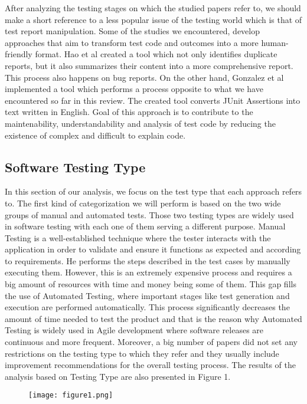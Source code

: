 After analyzing the testing stages on which the studied papers refer to, we should make a short reference to a less popular issue of the testing world which is that of test report manipulation. Some of the studies 
we encountered, develop approaches that aim to transform test code and outcomes into a more human-friendly format. Hao et al \cite{8811987} created a tool which not only identifies duplicate reports, but it also 
summarizes their content into a more comprehensive report. This process also happens on bug reports. On the other hand, Gonzalez et al \cite{10.1145/3283812.3283819} implemented a tool which performs a process 
opposite to what we have encountered so far in this review. The created tool converts JUnit Assertions into text written in English. Goal of this approach is to contribute to the maintenability, understandability 
and analysis of test code by reducing the existence of complex and difficult to explain code.

\subsection {Software Testing Type}
In this section of our analysis, we focus on the test type that each approach refers to. The first kind of categorization we will perform is based on the two wide groups of manual and automated tests. 
Those two testing types are widely used in software testing with each one of them serving a different purpose. Manual Testing is a well-established technique where the tester interacts with the 
application in order to validate and ensure it functions as expected and according to requirements. He performs the steps described in the test cases by manually executing them. However, this is an 
extremely expensive process and requires a big amount of resources with time and money being some of them. This gap fills the use of Automated Testing, where important stages like test generation and execution 
are performed automatically. This process significantly decreases the amount of time needed to test the product and that is the reason why Automated Testing is widely used in Agile development where 
software releases are continuous and more frequent. Moreover, a big number of papers did not set any restrictions on the testing type to which they refer and they usually include improvement recommendations for 
the overall testing process. The results of the analysis based on Testing Type are also presented in Figure 1.\\

\begin{figure}[h]
    \texttt{[image: figure1.png]}
    \centering
\end{figure}

